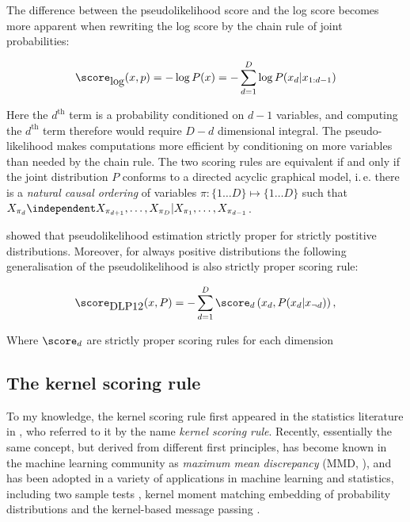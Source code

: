 The difference between the pseudolikelihood score and the log score becomes more apparent when rewriting the log score by the chain rule of joint probabilities:

\begin{equation}
	\score_{\mbox{log}}(x,p) = - \log P(x) =  - \sum_{d=1}^{D} \log P(x_d\vert x_{1:d-1})
\end{equation}

Here the $d^{\mbox{th}}$ term is a probability conditioned on $d-1$ variables, and computing the $d^{\mbox{th}}$ term therefore would require $D-d$ dimensional integral. The pseudo-likelihood makes computations more efficient by conditioning on more variables than needed by the chain rule. The two scoring rules are equivalent if and only if the joint distribution $P$ conforms to a directed acyclic graphical model, i.\,e. there is a \emph{natural causal ordering} of variables $\pi:\{1\ldots D\}\mapsto\{1\ldots D\}$ such that $X_{\pi_d}\independent X_{\pi_{d+1}},\ldots,X_{\pi_D} \vert X_{\pi_1},\ldots,X_{\pi_{d-1}}$. 

\cite{} showed that pseudolikelihood estimation strictly proper for strictly postitive distributions. Moreover, for always positive distributions the following generalisation of the pseudolikelihood is also strictly proper scoring rule:

\begin{equation}
	\score_{\mbox{DLP12}}(x,P) = - \sum_{d=1}^{D} \score_d\left(x_d, P(x_d \vert x_{\neg d})\right),
\end{equation}

Where $\score_d$ are strictly proper scoring rules for each dimension

\subsection{The kernel scoring rule}

To my knowledge, the kernel scoring rule first appeared in the statistics literature in \cite{Dawid}, who referred to it by the name \emph{kernel scoring rule}. Recently, essentially the same concept, but derived from different first principles, has become known in the machine learning community as \emph{maximum mean discrepancy} (MMD, \cite{}), and has been adopted in a variety of applications in machine learning and statistics, including two sample tests \cite{}, kernel moment matching \cite{} embedding of probability distributions \cite{} and the kernel-based message passing \cite{}.


